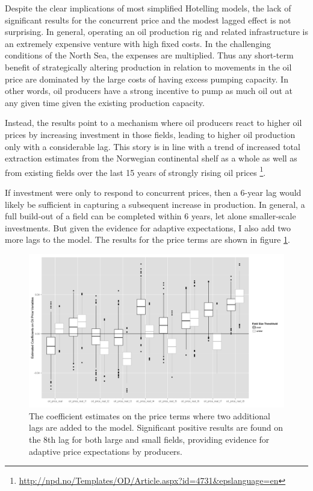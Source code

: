 \documentclass[12pt]{article}
\begin{document}
Despite the clear implications of most simplified Hotelling models, the lack of significant results for the concurrent price and the modest lagged effect is not surprising. In general, operating an oil production rig and related infrastructure is an extremely expensive venture with high fixed costs.  In the challenging conditions of the North Sea, the expenses are multiplied.  Thus any short-term benefit of strategically altering production in relation to movements in the oil price are dominated by the large costs of having excess pumping capacity.  In other words, oil producers have a strong incentive to pump as much oil out at any given time given the existing production capacity.

Instead, the results point to a mechanism where oil producers react to higher oil prices by increasing investment in those fields, leading to higher oil production only with a considerable lag.   This story is in line with a trend of increased total extraction estimates from the Norwegian continental shelf as a whole as well as from existing fields over the last 15 years of strongly rising oil prices \footnote{\url{http://npd.no/Templates/OD/Article.aspx?id=4731&epslanguage=en}}.

If investment were only to respond to concurrent prices, then a 6-year lag would likely be sufficient in capturing a subsequent increase in production.  In general, a full build-out of a field can be completed within 6 years, let alone smaller-scale investments.  But given the evidence for adaptive expectations, I also add two more lags to the model.  The results for the price terms are shown in figure \ref{gam_price_8}.

\begin{figure}
	\includegraphics[width=1\textwidth]{figures/gam_price_8_print.png}
	\caption{The coefficient estimates on the price terms where two additional lags are added to the model.  Significant positive results are found on the 8th lag for both large and small fields, providing evidence for adaptive price expectations by producers.}
	\label{gam_price_8}
\end{figure}
\end{document}
